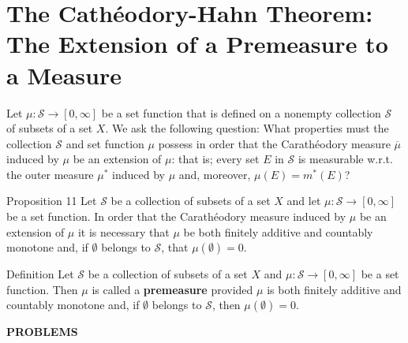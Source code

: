 \section{The Cath\'eodory-Hahn Theorem: The Extension of a Premeasure to a Measure}
Let $\mu:\mathcal{S}\to[0,\infty]$ be a set function that is defined on a nonempty collection $\mathcal{S}$ of subsets of a set $X$.
We ask the following question:
What properties must the collection $\mathcal{S}$ and set function $\mu$ possess in order that the Carath\'eodory measure $\overline{\mu}$ induced by $\mu$ be an extension of $\mu$:
that is; every set $E$ in $\mathcal{S}$ is measurable w.r.t. the outer measure $\mu^*$ induced by $\mu$ and, moreover, $\mu(E)=m^*(E)$?
\begin{namedthm*}{Proposition 11}
	Let $\mathcal{S}$ be a collection of subsets of a set $X$ and let $\mu:\mathcal{S}\to[0,\infty]$ be a set function.
	In order that the Carath\'eodory measure induced by $\mu$ be an extension of $\mu$ it is necessary that $\mu$ be both finitely additive and countably monotone and, if $\emptyset$ belongs to $\mathcal{S}$, that $\mu(\emptyset)=0$.
\end{namedthm*}
\begin{namedthm*}{Definition}
	Let $\mathcal{S}$ be a collection of subsets of a set $X$ and $\mu:\mathcal{S}\to[0,\infty]$ be a set function.
	Then $\mu$ is called a \textbf{premeasure} provided $\mu$ is both finitely additive and countably monotone and, if $\emptyset$ belongs to $\mathcal{S}$, then $\mu(\emptyset)=0$.
\end{namedthm*}
\begin{center}
	\textbf{PROBLEMS}
\end{center}
